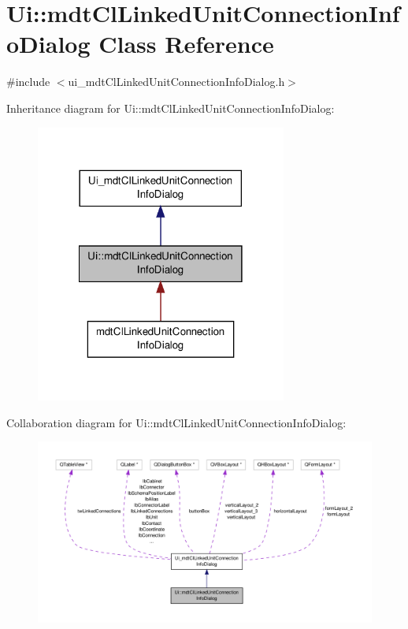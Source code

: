 \hypertarget{class_ui_1_1mdt_cl_linked_unit_connection_info_dialog}{\section{Ui\-:\-:mdt\-Cl\-Linked\-Unit\-Connection\-Info\-Dialog Class Reference}
\label{class_ui_1_1mdt_cl_linked_unit_connection_info_dialog}
}


{\ttfamily \#include $<$ui\-\_\-mdt\-Cl\-Linked\-Unit\-Connection\-Info\-Dialog.\-h$>$}



Inheritance diagram for Ui\-:\-:mdt\-Cl\-Linked\-Unit\-Connection\-Info\-Dialog\-:\nopagebreak
\begin{figure}[H]
\begin{center}
\leavevmode
\includegraphics[width=234pt]{class_ui_1_1mdt_cl_linked_unit_connection_info_dialog__inherit__graph}
\end{center}
\end{figure}


Collaboration diagram for Ui\-:\-:mdt\-Cl\-Linked\-Unit\-Connection\-Info\-Dialog\-:\nopagebreak
\begin{figure}[H]
\begin{center}
\leavevmode
\includegraphics[width=350pt]{class_ui_1_1mdt_cl_linked_unit_connection_info_dialog__coll__graph}
\end{center}
\end{figure}
